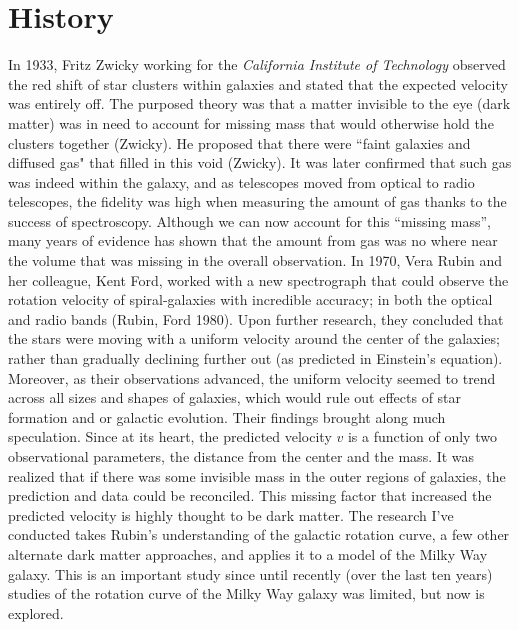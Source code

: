 \documentclass[titlepage]{article}
\begin{document}
\section{History}
In 1933, Fritz Zwicky working for the \textit{California Institute of Technology} observed the red shift of star clusters within galaxies and stated that the expected velocity was entirely off. The purposed theory was that a matter invisible to the eye (dark matter) was in need to account for missing mass that would otherwise hold the clusters together (Zwicky). He proposed that there were ``faint galaxies and diffused gas" that filled in this void (Zwicky). It was later confirmed that such gas was indeed within the galaxy, and as telescopes moved from optical to radio telescopes, the fidelity was high when measuring the amount of gas thanks to the success of spectroscopy.  Although we can now account for this ``missing mass'', many years of evidence has shown that the amount from gas was no where near the volume that was missing in the overall observation. In 1970, Vera Rubin and her colleague, Kent Ford, worked with a new spectrograph that could observe the rotation velocity of spiral-galaxies with incredible accuracy; in both the optical and radio bands (Rubin, Ford 1980). Upon further research, they concluded that the stars were moving with a uniform velocity around the center of the galaxies; rather than gradually declining further out (as predicted in Einstein's equation).  Moreover, as their observations advanced, the uniform velocity seemed to trend across all sizes and shapes of galaxies, which would rule out effects of star formation and or galactic evolution. Their findings brought along much speculation.  Since at its heart, the predicted velocity $v$ is a function of only two observational parameters, the distance from the center and the mass. It was realized that if there was some invisible mass in the outer regions of galaxies, the prediction and data could be reconciled. This missing factor that increased the predicted velocity is highly thought to be dark matter. The research I've conducted takes Rubin's understanding of the galactic rotation curve, a few other alternate dark matter approaches, and applies it to a model of the Milky Way galaxy.  This is an important study since until recently (over the last ten years) studies of the rotation curve of the Milky Way galaxy was limited, but now is explored.
\end{document}
